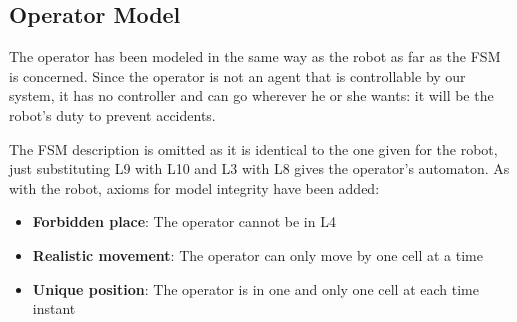
\subsection{Operator Model}
The operator has been modeled in the same way as the robot as far as the FSM is concerned. Since the operator is not an agent that is controllable by our system, it has no controller and can go wherever he or she wants: it will be the robot's duty to prevent accidents.

The FSM description is omitted as it is identical to the one given for the robot, just substituting L9 with L10 and L3 with L8 gives the operator's automaton.
As with the robot, axioms for model integrity have been added:

\begin{itemize}
	\item \textbf{Forbidden place}: The operator cannot be in L4
	
	\item \textbf{Realistic movement}: The operator can only move by one cell at a time
	
	\item \textbf{Unique position}: The operator is in one and only one cell at each time instant
\end{itemize}